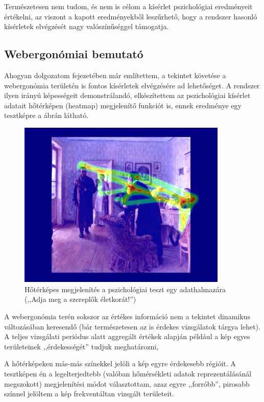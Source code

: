 Természetesen nem tudom, és nem is célom a kísérlet pszichológiai eredményeit értékelni, az viszont a kapott eredményekből leszűrhető, hogy a rendszer hasonló kísérletek elvégzését nagy valószínűséggel támogatja.

\subsection{Webergonómiai bemutató}\label{sect:web}

Ahogyan dolgozatom  fejezetében már említettem, a tekintet követése a webergonómia területén is fontos kísérletek elvégzésére ad lehetőséget. A rendszer ilyen irányú képességeit demonstrálandó, elkészítettem az pszichológiai kísérlet adatait hőtérképen (heatmap) megjelenítő funkciót is, ennek eredménye egy tesztképre a  ábrán látható.

\begin{figure}[!ht]
\centering
\includegraphics[width=100mm, keepaspectratio]{figures/heatmap.jpg}
\caption{Hőtérképes megjelenítés a pszichológiai teszt egy adathalmazára (,,Adja meg a szereplők életkorát!'')}
\label{fig:heatmap}
\end{figure}

A webergonómia terén sokszor az értékes információ nem a tekintet dinamikus változásában keresendő (bár természetesen az is érdekes vizsgálatok tárgya lehet). A teljes vizsgálati periódus alatt aggregált értékek alapján például a kép egyes területeinek ,,érdekességét'' tudjuk meghatározni, 

A hőtérképeken más-más színekkel jelöli a kép egyre érdekesebb régióit. A tesztképen én a legelterjedtebb (valóban hőmérsékleti adatok reprezentálásánál megszokott) megjelenítési módot választottam, azaz egyre ,,forróbb'', pirosabb színnel jelöltem a kép frekventáltan vizsgált területeit.

